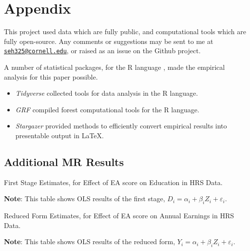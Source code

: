 \appendix
\setcounter{table}{0}
\renewcommand{\thetable}{A\arabic{table}}
\setcounter{figure}{0}
\renewcommand{\thefigure}{A\arabic{figure}}

\section{Appendix}
\label{appendix}
This project used data which are fully public, and computational tools which are fully open-source.
Any comments or suggestions may be sent to me at \href{mailto:seh325@cornell.edu}{\nolinkurl{seh325@cornell.edu}}, or raised as an issue on the Github project.

A number of statistical packages, for the R language \citep{R2023}, made the empirical analysis for this paper possible.
\begin{itemize}
    \item \textit{Tidyverse} \citep{tidyverse} collected tools for data analysis in the R language.
    \item \textit{GRF} \citep{athey2019generalized,grf} compiled forest computational tools for the R language.
    \item \textit{Stargazer} \citep{stargazer} provided methods to efficiently convert empirical results into presentable output in \LaTeX.
\end{itemize}

\subsection{Additional MR Results}

\begin{table}[H]
    \singlespacing
    \small
    \centering
    \caption{First Stage Estimates, for Effect of EA score on Education in HRS Data.}
    \makebox[\textwidth][c]{}
    \label{tab:firststage-reg}
    \justify
    \footnotesize
    \textbf{Note}:
    This table shows OLS results of the first stage, $D_i = \alpha_i + \beta_i Z_i + \varepsilon_i$.
\end{table}

\begin{table}[H]
    \singlespacing
    \small
    \centering
    \caption{Reduced Form Estimates, for Effect of EA score on Annual Earnings in HRS Data.}
    \makebox[\textwidth][c]{}
    \label{tab:reducedform-reg}
    \justify
    \footnotesize
    \textbf{Note}:
    This table shows OLS results of the reduced form, $Y_i = \alpha_i + \beta_i Z_i + \varepsilon_i$.
\end{table}

